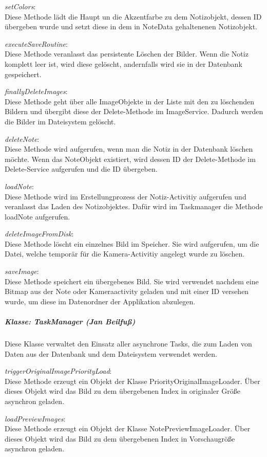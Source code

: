 \textit{setColors}:\\
Diese Methode lädt die Haupt un die Akzentfarbe zu dem Notizobjekt, dessen ID übergeben wurde und setzt diese in dem in NoteData gehaltenenen Notizobjekt.

\textit{executeSaveRoutine}:\\
Diese Methode veranlasst das persistente Löschen der Bilder. Wenn die Notiz komplett leer ist, wird diese gelöscht, andernfalls wird sie in der Datenbank gespeichert. 

\textit{finallyDeleteImages}:\\
Diese Methode geht über alle ImageObjekte in der Liste mit den zu löschenden Bildern und übergibt diese der Delete-Methode im ImageService. Dadurch werden die Bilder im Dateisystem gelöscht.

\textit{deleteNote}:\\
Diese Methode wird aufgerufen, wenn man die Notiz in der Datenbank löschen möchte. Wenn das NoteObjekt existiert, wird dessen ID der Delete-Methode im Delete-Service aufgerufen und die ID übergeben.

\textit{loadNote}:\\
Diese Methode wird im Erstellungprozess der Notiz-Activitiy aufgerufen und veranlasst das Laden des Notizobjektes. Dafür wird im Taskmanager die Methode loadNote aufgerufen.

\textit{deleteImageFromDisk}:\\
Diese Methode löscht ein einzelnes Bild im Speicher. Sie wird aufgerufen, um die Datei, welche temporär für die Kamera-Activitiy angelegt wurde zu löschen. 

\textit{saveImage}:\\
 Diese Methode speichert ein übergebenes Bild. Sie wird verwendet nachdem eine Bitmap aus der Note oder Kameraactivity geladen und mit einer ID versehen wurde, um diese im Datenordner der Applikation abzulegen.

\subparagraph*{Klasse: TaskManager (Jan Beilfuß)}
Diese Klasse verwaltet den Einsatz aller asynchrone Tasks, die zum Laden von Daten aus der Datenbank und dem Dateisystem verwendet werden. 

\textit{triggerOriginalImagePriorityLoad}:\\
Diese Methode erzeugt ein Objekt der Klasse PriorityOriginalImageLoader. Über dieses Objekt wird das Bild zu dem übergebenen Index in originaler Größe asynchron geladen.

\textit{loadPreviewImages}:\\
Diese Methode erzeugt ein Objekt der Klasse NotePreviewImageLoader. Über dieses Objekt wird das Bild zu dem übergebenen Index in Vorschaugröße asynchron geladen.

